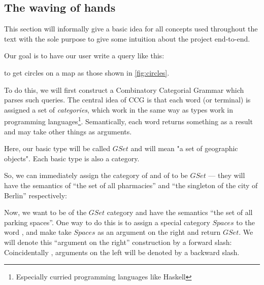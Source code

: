 \documentclass[main.tex]{subfiles}
\begin{document}
\subsection{The waving of hands}
This section will informally give a basic idea for all concepts used throughout the text
with the sole purpose to give some intuition about the project end-to-end.

Our goal is to have our user write a query like this:
\begin{center}
\end{center}
to get circles on a map as those shown in \cref{fig:circles}.


To do this, we will first construct a Combinatory Categorial Grammar which parses
such queries. The central idea of CCG is that each word (or terminal) is assigned
a set of
\emph{categories}, which work in the same way as types work in programming
languages\footnote{Especially curried programming languages like Haskell}.
Semantically, each word returns something as a result and may take other things as arguments.

Here, our basic type will be called $GSet$ and will mean "a set of geographic
objects". Each basic type is also a category.

So, we can immediately assign the category of  and of
 to be $GSet$ --- they will have the semantics of ``the set of all
pharmacies'' and ``the singleton of the city of Berlin'' respectively:

Now, we want  to be of the $GSet$ category and have the semantics
``the set of all parking spaces''. One way to do this is to assign a special
category $Spaces$ to the word , and make  take
$Spaces$ as an argument on the right and return $GSet$. We will denote this
``argument on the right'' construction by a forward slash:
Coincidentally , arguments on the left will be denoted by a backward slash.
\end{document}
